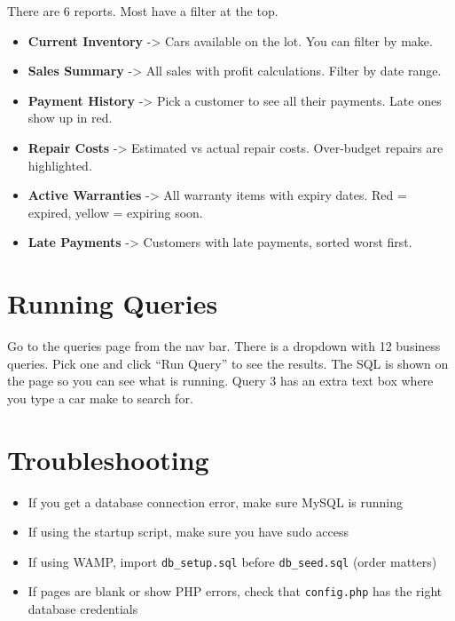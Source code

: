 \documentclass[12pt]{article}
\begin{document}
There are 6 reports. Most have a filter at the top.

\begin{itemize}
  \item \textbf{Current Inventory} -> Cars available on the lot. You can filter by make.
  \item \textbf{Sales Summary} -> All sales with profit calculations. Filter by date range.
  \item \textbf{Payment History} -> Pick a customer to see all their payments. Late ones show up in red.
  \item \textbf{Repair Costs} -> Estimated vs actual repair costs. Over-budget repairs are highlighted.
  \item \textbf{Active Warranties} -> All warranty items with expiry dates. Red = expired, yellow = expiring soon.
  \item \textbf{Late Payments} -> Customers with late payments, sorted worst first.
\end{itemize}

\section{Running Queries}

Go to the queries page from the nav bar. There is a dropdown with 12 business queries. Pick one and click ``Run Query'' to see the results. The SQL is shown on the page so you can see what is running. Query 3 has an extra text box where you type a car make to search for.

\section{Troubleshooting}

\begin{itemize}
  \item If you get a database connection error, make sure MySQL is running
  \item If using the startup script, make sure you have sudo access
  \item If using WAMP, import \texttt{db\_setup.sql} before \texttt{db\_seed.sql} (order matters)
  \item If pages are blank or show PHP errors, check that \texttt{config.php} has the right database credentials
\end{itemize}
\end{document}
